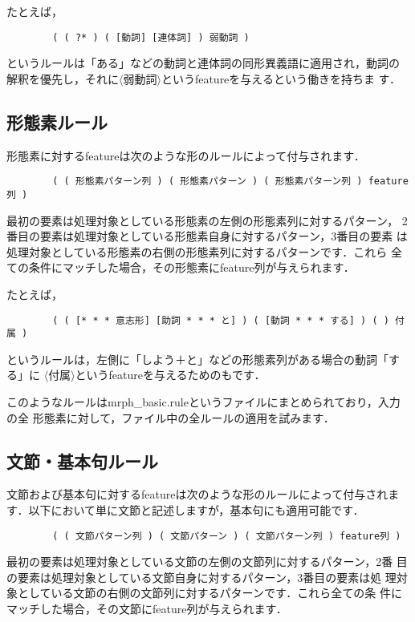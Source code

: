 \documentclass[a4j,11pt,titlepage]{jarticle}
\def\fl{$\langle$}
\def\fr{$\rangle$}
\begin{document}
たとえば，
\begin{verbatim}
        ( ( ?* ) ( [動詞] [連体詞] ) 弱動詞 )  
\end{verbatim}
というルールは「ある」などの動詞と連体詞の同形異義語に適用され，動詞の
解釈を優先し，それに\fl 弱動詞\fr というfeatureを与えるという働きを持ちま
す．


\subsection{形態素ルール}

形態素に対するfeatureは次のような形のルールによって付与されます．
\begin{verbatim}
        ( ( 形態素パターン列 ) ( 形態素パターン ) ( 形態素パターン列 ) feature列 )
\end{verbatim}
最初の要素は処理対象としている形態素の左側の形態素列に対するパターン，
2番目の要素は処理対象としている形態素自身に対するパターン，3番目の要素
は処理対象としている形態素の右側の形態素列に対するパターンです．これら
全ての条件にマッチした場合，その形態素にfeature列が与えられます．

たとえば，
\begin{verbatim}
        ( ( [* * * 意志形] [助詞 * * * と] ) ( [動詞 * * * する] ) ( ) 付属 )
\end{verbatim}
というルールは，左側に「しよう＋と」などの形態素列がある場合の動詞「する」に
\fl 付属\fr というfeatureを与えるためのもです．

このようなルールはmrph\_basic.ruleというファイルにまとめられており，入力の全
形態素に対して，ファイル中の全ルールの適用を試みます．


\subsection{文節・基本句ルール}

文節および基本句に対するfeatureは次のような形のルールによって付与されま
す．以下において単に文節と記述しますが，基本句にも適用可能です．
\begin{verbatim}
        ( ( 文節パターン列 ) ( 文節パターン ) ( 文節パターン列 ) feature列 )
\end{verbatim}
最初の要素は処理対象としている文節の左側の文節列に対するパターン，2番
目の要素は処理対象としている文節自身に対するパターン，3番目の要素は処
理対象としている文節の右側の文節列に対するパターンです．これら全ての条
件にマッチした場合，その文節にfeature列が与えられます．
\end{document}
